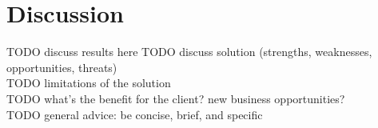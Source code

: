 \chapter{Discussion}
TODO discuss results here
TODO discuss solution (strengths, weaknesses, opportunities, threats)\\
TODO limitations of the solution\\
TODO what's the benefit for the client? new business opportunities?\\
TODO general advice: be concise, brief, and specific\\
